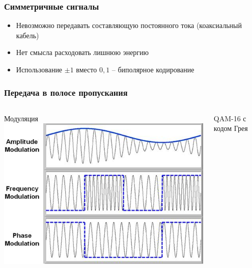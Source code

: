 \documentclass[utf8]{beamer}
\begin{document}
\begin{frame}
\frametitle{Симметричные сигналы}
\begin{itemize}
 \item Невозможно передавать составляющую постоянного тока (коаксиальный кабель)
 \item Нет смысла расходовать лишнюю энергию
 \item Использование ${\pm1}$ вместо ${0,1}$ -- биполярное кодирование
\end{itemize}
\end{frame}
\begin{frame}
\frametitle{Передача в полосе пропускания}
\begin{columns}
\begin{block}{Модуляция}
\includegraphics[width=\textwidth]{pic/modulation.jpg}
\end{block}
\begin{block}{QAM-16 с кодом Грея}

\end{block}
\end{columns}
\end{frame}
\end{document}
